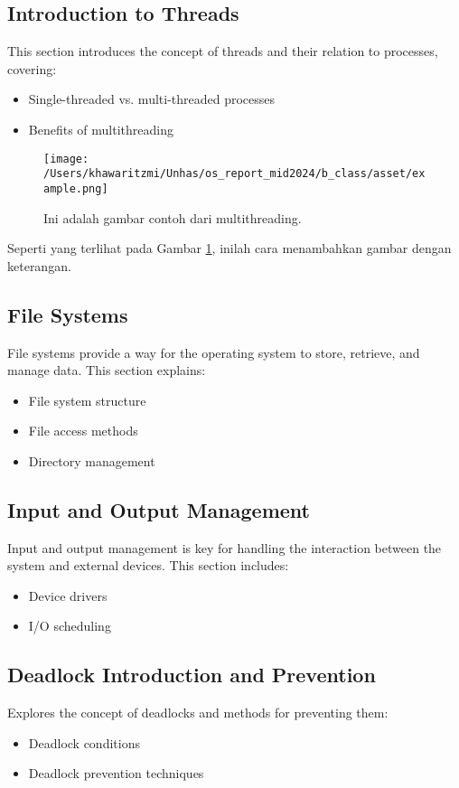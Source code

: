 \documentclass[12pt]{article}
\begin{document}
\subsection{Introduction to Threads}
This section introduces the concept of threads and their relation to processes, covering:
\begin{itemize}
    \item Single-threaded vs. multi-threaded processes
    \item Benefits of multithreading
\end{itemize}

\begin{figure}[h]
    \centering
    \texttt{[image: /Users/khawaritzmi/Unhas/os\_report\_mid2024/b\_class/asset/example.png]}  %
    \caption{Ini adalah gambar contoh dari multithreading.}
    \label{fig:contoh_gambar}
\end{figure}

Seperti yang terlihat pada Gambar \ref{fig:contoh_gambar}, inilah cara menambahkan gambar dengan keterangan.

\subsection{File Systems}
File systems provide a way for the operating system to store, retrieve, and manage data. This section explains:
\begin{itemize}
    \item File system structure
    \item File access methods
    \item Directory management
\end{itemize}

\subsection{Input and Output Management}
Input and output management is key for handling the interaction between the system and external devices. This section includes:
\begin{itemize}
    \item Device drivers
    \item I/O scheduling
\end{itemize}

\subsection{Deadlock Introduction and Prevention}
Explores the concept of deadlocks and methods for preventing them:
\begin{itemize}
    \item Deadlock conditions
    \item Deadlock prevention techniques
\end{itemize}
\end{document}
